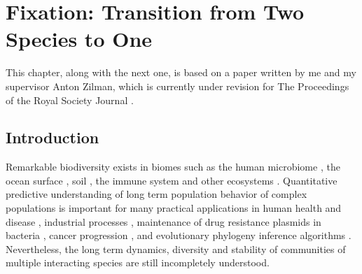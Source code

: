 \chapter{Fixation: Transition from Two Species to One}


\iffalse
"strategic lit review"
"gap"
"thesis" "in this paper I will..."
"roadmap"
"short significance"
\fi


This chapter, along with the next one, is based on a paper written by me and my supervisor Anton Zilman, which is currently under revision for The Proceedings of the Royal Society Journal \cite{Badali2019a}. 

\section{Introduction}

\iffalse
Remarkable biodiversity exists in biomes such as the human microbiome \cite{Korem2015,Coburn2015,Palmer2001}, the ocean surface \cite{Hutchinson1961,Cordero2016}, soil \cite{Friedman2016}, the immune system \cite{Weinstein2009,Desponds2015,Stirk2010} and other ecosystems \cite{Tilman1996,Naeem2001}. 
Quantitative predictive understanding of long term population behavior of complex populations is important for many practical applications in human health and disease \cite{Coburn2015,Palmer2001,Kinross2011}, industrial processes \cite{Wolfe2014}, maintenance of drug resistance plasmids in bacteria \cite{Gooding-townsend2015}, cancer progression \cite{Ashcroft2015}, and evolutionary phylogeny inference algorithms \cite{Kingman1982,Rice2004,Blythe2007}. 
Nevertheless, the long term dynamics, diversity and stability of communities of multiple interacting species are still incompletely understood.

